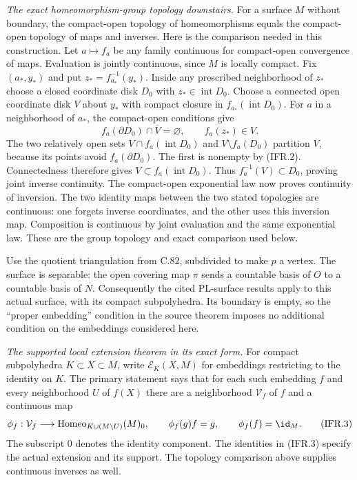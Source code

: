 \emph{The exact homeomorphism-group topology downstairs.}
For a surface $M$ without boundary, the compact-open topology of
homeomorphisms equals the compact-open topology of maps and inverses.
Here is the comparison needed in this construction. Let $a\mapsto f_a$
be any family continuous for compact-open convergence of maps.
Evaluation is jointly continuous, since $M$ is locally compact.
Fix $(a_*,y_*)$ and put $z_*=f_{a_*}^{-1}(y_*)$.
Inside any prescribed neighborhood of $z_*$ choose a closed coordinate
disk $D_0$ with $z_*\in\operatorname{int}D_0$.
Choose a connected open coordinate disk $V$ about $y_*$ with compact
closure in $f_{a_*}(\operatorname{int}D_0)$.
For $a$ in a neighborhood of $a_*$, the compact-open conditions give
\[
 f_a(\partial D_0)\cap\overline V=\varnothing,
                  \qquad f_a(z_*)\in V.                         \tag{IFR.2}
\]
The two relatively open sets
$V\cap f_a(\operatorname{int}D_0)$ and $V\setminus f_a(D_0)$
partition $V$, because its points avoid $f_a(\partial D_0)$.
The first is nonempty by (IFR.2). Connectedness therefore gives
$V\subset f_a(\operatorname{int}D_0)$.
Thus $f_a^{-1}(V)\subset D_0$, proving joint inverse continuity.
The compact-open exponential law now proves continuity of inversion.
The two identity maps between the two stated topologies are continuous:
one forgets inverse coordinates, and the other uses this inversion map.
Composition is continuous by joint evaluation and the same exponential
law. These are the group topology and exact comparison used below.

Use the quotient triangulation from C.82, subdivided to make $p$
a vertex. The surface is separable: the open covering map $\pi$
sends a countable basis of $O$ to a countable basis of $N$.
Consequently the cited PL-surface results apply to this actual
surface, with its compact subpolyhedra. Its boundary is empty,
so the ``proper embedding'' condition in the source theorem imposes
no additional condition on the embeddings considered here.

\emph{The supported local extension theorem in its exact form.}
For compact subpolyhedra $K\subset X\subset M$, write
$\mathcal E_K(X,M)$ for embeddings restricting to the identity on $K$.
The primary statement
\cite[Theorem~2.1, p.~2]{C_Yagasaki2000} says that for each such
embedding $f$ and every neighborhood $U$ of $f(X)$ there are a
neighborhood $\mathcal V_f$ of $f$ and a continuous map
\[
 \phi_f:\mathcal V_f\longrightarrow
 \operatorname{Homeo}_{K\cup(M\setminus U)}(M)_0,
 \qquad \phi_f(g)f=g,\qquad \phi_f(f)=\id_M.                    \tag{IFR.3}
\]
The subscript $0$ denotes the identity component. The identities
in (IFR.3) specify the actual extension and its support. The topology
comparison above supplies continuous inverses as well.

